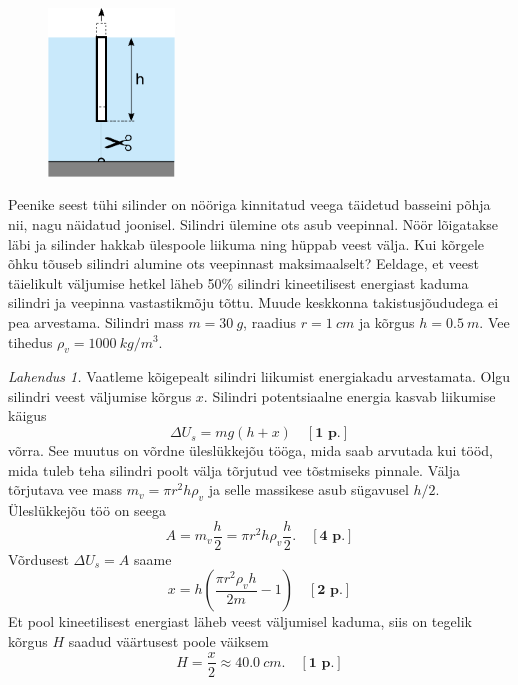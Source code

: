 \setAuthor{}

\begin{figure}
    \vspace{-30pt}
	\includegraphics[width=0.3\textwidth]{2020-v2g-03-yl.pdf}
\end{figure}


Peenike seest tühi silinder on nööriga kinnitatud veega täidetud basseini põhja nii, nagu näidatud joonisel. 
Silindri ülemine ots asub veepinnal. Nöör lõigatakse läbi ja silinder hakkab ülespoole liikuma ning hüppab veest välja. Kui kõrgele õhku tõuseb silindri alumine ots veepinnast maksimaalselt? Eeldage, et veest täielikult väljumise hetkel läheb 50\% silindri kineetilisest energiast kaduma silindri ja veepinna vastastikmõju tõttu. Muude keskkonna takistusjõududega ei pea arvestama.
Silindri mass $m = \SI{30}{g}$, raadius $r = \SI{1}{cm}$ ja kõrgus $h = \SI{0.5}{m}$. Vee tihedus $\rho_v=\SI{1000}{kg/m^3}$. 


\hint

\solu
\emph{Lahendus 1.}
Vaatleme kõigepealt silindri liikumist energiakadu arvestamata. Olgu silindri veest väljumise kõrgus $x$. Silindri potentsiaalne energia kasvab liikumise käigus
\[
\Delta U_s=mg(h+x)\quad[\textbf{1 p.}]
\]
võrra. See muutus on võrdne üleslükkejõu tööga, mida saab arvutada kui tööd, mida tuleb teha silindri poolt välja tõrjutud vee tõstmiseks pinnale. Välja tõrjutava vee mass $m_v=\pi r^2 h \rho_v$ ja selle massikese asub sügavusel $h/2$. Üleslükkejõu töö on seega
\[
A=m_v\frac{h}{2}=\pi r^2 h \rho_v\frac{h}{2}.\quad[\textbf{4 p.}]
\]
Võrdusest $\Delta U_s=A$ saame
\[
x=h\left(\frac{\pi r^2 \rho_v h}{2m}-1\right) \quad[\textbf{2 p.}]
\]
Et pool kineetilisest energiast läheb veest väljumisel kaduma, siis on tegelik kõrgus $H$ saadud väärtusest poole väiksem
\[
H=\frac{x}{2}\approx\SI{40.0}{cm}. \quad[\textbf{1 p.}]
\]


